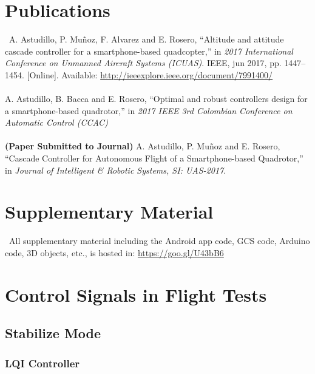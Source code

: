 \begin{appendices}
\chapter{Publications} \label{publications}
\
A. Astudillo, P. Muñoz, F. Alvarez and E. Rosero, “Altitude and attitude cascade controller for a smartphone-based quadcopter,” in \textit{2017 International Conference on Unmanned Aircraft Systems (ICUAS)}. IEEE, jun 2017, pp. 1447–1454. [Online]. Available: \url{http://ieeexplore.ieee.org/document/7991400/}
\\\\
A. Astudillo, B. Bacca and E. Rosero, “Optimal and robust controllers design for a smartphone-based quadrotor,” in \textit{2017 IEEE 3rd Colombian Conference on Automatic Control (CCAC)}
\\\\
\textbf{(Paper Submitted to Journal)} A. Astudillo, P. Muñoz and E. Rosero, “Cascade Controller for Autonomous Flight of a Smartphone-based Quadrotor,” in \textit{Journal of Intelligent \& Robotic Systems, SI: UAS-2017}.

\chapter{Supplementary Material} \label{supplementary}
\
All supplementary material including the Android app code, GCS code, Arduino code, 3D objects, etc., is hosted in:
\url{https://goo.gl/U43bB6}


\chapter{Control Signals in Flight Tests}\label{controlsignals}

\section*{Stabilize Mode}

\subsection*{LQI Controller}


\end{appendices}
